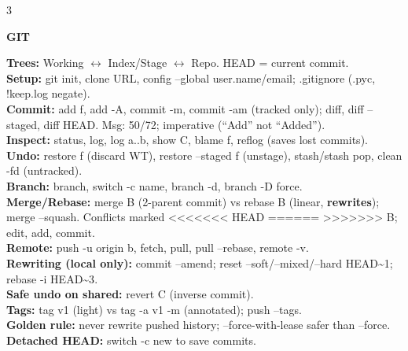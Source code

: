 \documentclass[10pt,letterpaper]{article}
\newenvironment{topic}[1]{%
  \par\addvspace{1.5pt}%
  \noindent\colorbox{hdrBG}{%
    \begin{minipage}{\dimexpr\linewidth-2\fboxsep\relax}%
      \centering\bfseries\sffamily\fontsize{6pt}{7pt}\selectfont\color{hdrFG}\MakeUppercase{#1}%
    \end{minipage}%
  }\par\nobreak\vskip0.5pt%
  \begingroup\setlength{\leftskip}{0pt}\setlength{\rightskip}{0pt}%
}{%
  \endgroup\par\addvspace{0.5pt}%
}
\newcommand{\warn}[1]{\textcolor{warnC}{\textbf{#1}}}
\newcommand{\ok}[1]{\textcolor{okC}{\textbf{#1}}}
\newcommand{\hd}[1]{\textcolor{accent}{\textbf{#1}}}
\newcommand{\cn}[1]{{\ttfamily\small #1}}
\begin{document}
\begin{multicols*}{3}
\begin{topic}{Git}
\hd{Trees:} Working $\leftrightarrow$ Index/Stage $\leftrightarrow$ Repo. HEAD = current commit.\\
\hd{Setup:} \cn{git init}, \cn{clone URL}, \cn{config --global user.name/email}; \cn{.gitignore} (\cn{*.pyc}, \cn{!keep.log} negate).\\
\hd{Commit:} \cn{add f}, \cn{add -A}, \cn{commit -m}, \cn{commit -am} (tracked only); \cn{diff}, \cn{diff --staged}, \cn{diff HEAD}. Msg: 50/72; imperative (``Add'' not ``Added'').\\
\hd{Inspect:} \cn{status}, \cn{log}, \cn{log a..b}, \cn{show C}, \cn{blame f}, \cn{reflog} (saves lost commits).\\
\hd{Undo:} \cn{restore f} (discard WT), \cn{restore --staged f} (unstage), \cn{stash}/\cn{stash pop}, \cn{clean -fd} (untracked).\\
\hd{Branch:} \cn{branch}, \cn{switch -c name}, \cn{branch -d}, \cn{branch -D} force.\\
\hd{Merge/Rebase:} \cn{merge B} (2-parent commit) vs \cn{rebase B} (linear, \warn{rewrites}); \cn{merge --squash}. Conflicts marked \cn{<<<<<<< HEAD ====== >>>>>>> B}; edit, add, commit.\\
\hd{Remote:} \cn{push -u origin b}, \cn{fetch}, \cn{pull}, \cn{pull --rebase}, \cn{remote -v}.\\
\warn{Rewriting (local only):} \cn{commit --amend}; \cn{reset --soft/--mixed/--hard HEAD\textasciitilde 1}; \cn{rebase -i HEAD\textasciitilde 3}.\\
\ok{Safe undo on shared:} \cn{revert C} (inverse commit).\\
\hd{Tags:} \cn{tag v1} (light) vs \cn{tag -a v1 -m} (annotated); \cn{push --tags}.\\
\warn{Golden rule:} never rewrite pushed history; \cn{--force-with-lease} safer than \cn{--force}.\\
\hd{Detached HEAD:} \cn{switch -c new} to save commits.
\end{topic}


\end{multicols*}
\end{document}
